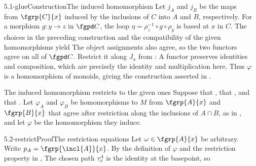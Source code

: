 \begin{proofpassage}{5.1-glue}{Construction}{The induced homomorphism}
Let $j_A$ and $j_B$ be the maps from $\fgrp{C}{x}$ induced by the
inclusions of $C$ into $A$ and $B$, respectively.
For a morphism $g:y\longrightarrow z$ in $\fgpd C$, the loop
$\eta=\rho_z^{-1}\circ g\circ\rho_y$ is based at $x$ in $C$.
The choices in the preceding construction and the compatibility of the
given homomorphisms yield
The object assignments also agree, so the two functors agree on all of
$\fgpd C$.    Restrict it along $J_x$ from :
A functor preserves identities and composition, which are precisely the
identity and multiplication here.  Thus $\varphi$ is a homomorphism of
monoids, giving the construction asserted in .
\end{proofpassage}

\begin{proposition}[id=5.2]{The induced homomorphism restricts to the given ones}
Suppose that \hypCoverTwo, that \hypPathConnected, and that \hypBasepoint.  Let
$\varphi_{A}$ and $\varphi_{B}$ be homomorphisms to $M$ from $\fgrp{A}{x}$ and
$\fgrp{B}{x}$ that agree after restriction along the inclusions of $A \cap B$,
as in , and let $\varphi$ be the homomorphism they induce.
\end{proposition}

\begin{proofpassage}{5.2-restrict}{Proof}{The restriction equations}
Let $\omega\in\fgrp{A}{x}$ be arbitrary.  Write $p_A=\fgrp{\incl{A}}{x}$.
By the definition of $\varphi$ and the restriction property in
,
The chosen path $\tau^A_x$ is the identity at the basepoint, so
\end{proofpassage}

